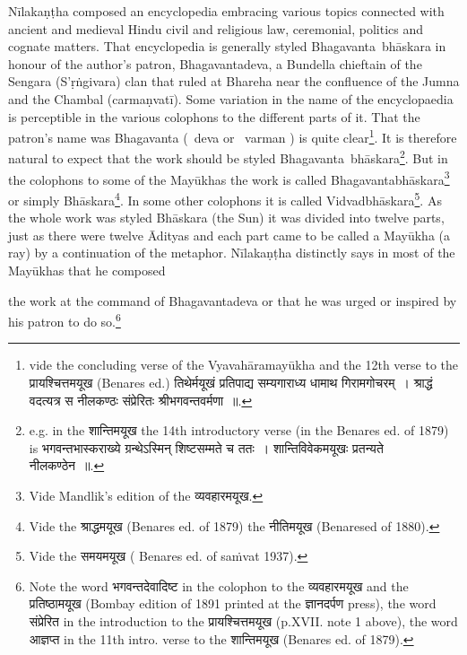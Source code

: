 \documentclass[11pt, openany]{book}
\begin{document}
Nīlakaṇṭha composed an encyclopedia embracing various topics connected with ancient and medieval Hindu civil and religious law, ceremonial, politics and cognate matters. That encyclopedia is generally styled Bhagavanta\textendash\ bhāskara in honour of the author's patron, Bhagavantadeva, a Bundella chieftain of the Sengara (S'ṛṅgivara) clan that ruled at Bhareha near the confluence of the Jumna and the Chambal (carmaṇvatī). Some variation in the name of the encyclopaedia is perceptible in the various colophons to the different parts of it. That the patron's name was Bhagavanta (\textendash\ deva or \textendash\ varman ) is quite clear\renewcommand{\thefootnote}{1}\footnote{vide the concluding verse of the Vyavahāramayūkha and the 12th verse to the प्रायश्चित्तमयूख (Benares ed.) {\qt तिथेर्मयूखं प्रतिपाद्य सम्यगाराध्य धामाथ गिरामगोचरम्~। श्राद्धं वदत्यत्र स नीलकण्ठः संप्रेरितः श्रीभगवन्तवर्मणा~॥}.}. It is therefore natural to expect that the work should be styled Bhagavanta\textendash\ bhāskara\renewcommand{\thefootnote}{2}\footnote{e.g. in the शान्तिमयूख the 14th introductory verse (in the Benares ed. of 1879) is {\qt भगवन्तभास्कराख्ये ग्रन्थेऽस्मिन् शिष्टसम्मते च ततः~। शान्तिविवेकमयूखः प्रतन्यते नीलकण्ठेन~॥}.}. But in the colophons to some of the Mayūkhas the work is called Bhagavantabhāskara\renewcommand{\thefootnote}{3}\footnote{Vide Mandlik's edition of the व्यवहारमयूख.} or simply Bhāskara\renewcommand{\thefootnote}{4}\footnote{Vide the श्राद्धमयूख (Benares ed. of 1879) the नीतिमयूख (Benaresed of 1880).}. In some other colophons it is called Vidvadbhāskara\renewcommand{\thefootnote}{5}\footnote{Vide the समयमयूख ( Benares ed. of saṁvat 1937).}. As the whole work was styled Bhāskara (the Sun) it was divided into twelve parts, just as there were twelve Ādityas and each part came to be called a Mayūkha (a ray) by a continuation of the metaphor. Nīlakaṇṭha distinctly says in most of the Mayūkhas that he composed

\newpage

\noindent
the work at the command of Bhagavantadeva or that he was urged or inspired by his patron to do so.\renewcommand{\thefootnote}{1}\footnote{Note the word भगवन्तदेवादिष्ट in the colophon to the व्यवहारमयूख and the प्रतिष्ठामयूख (Bombay edition of 1891 printed at the ज्ञानदर्पण press), the word संप्रेरित in the introduction to the प्रायश्चित्तमयूख (p.XVII. note 1 above), the word आज्ञप्त in the 11th intro. verse to the शान्तिमयूख (Benares ed. of 1879).}
\end{document}
